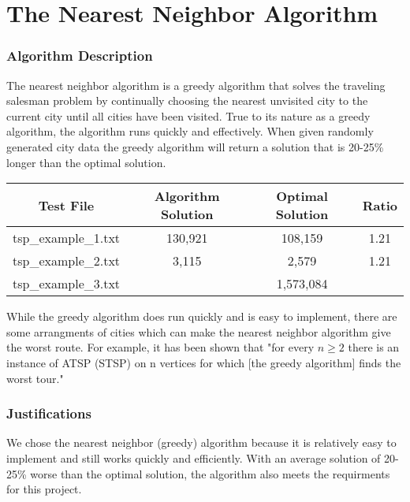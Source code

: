 \documentclass[Group45_Project_Report.tex]{subfiles}
\begin{document}
\part*{The Nearest Neighbor Algorithm}

\section*{Algorithm Description}
The nearest neighbor algorithm is a greedy algorithm that solves the traveling salesman problem by continually choosing the nearest unvisited city to the current city until all cities have been visited. True to its nature as a greedy algorithm, the algorithm runs quickly and effectively. When given randomly generated city data the greedy algorithm will return a solution that is 20-25\% longer than the optimal solution.

\begin{center}
\begin{tabular}{ ||c|c|c|c|| } 
 \hline
 \textbf{Test File} & \textbf{Algorithm Solution} & \textbf{Optimal Solution} & \textbf{Ratio}\\[0.5ex]
 \hline\hline
 tsp\_example\_1.txt & 130,921 & 108,159 & 1.21 \\ 
 \hline
 tsp\_example\_2.txt & 3,115 & 2,579 & 1.21 \\ 
 \hline
 tsp\_example\_3.txt &  & 1,573,084 &  \\ 
 \hline
\end{tabular}
\end{center}

While the greedy algorithm does run quickly and is easy to implement, there are some arrangments of cities which can make the nearest neighbor algorithm give the worst route. For example, it has been shown that "for every $n \geq 2$ there is an instance of ATSP (STSP) on n vertices for which [the greedy algorithm] finds the worst tour."~\cite{Gutin}

\section*{Justifications}
We chose  the nearest neighbor (greedy) algorithm because it is relatively easy to implement and still works quickly and efficiently. With an average solution of 20-25\% worse than the optimal solution, the algorithm also meets the requirments for this project. 
\end{document}
